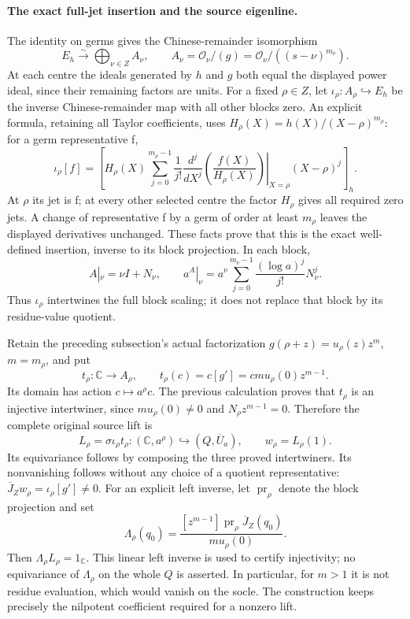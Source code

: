 \documentclass[10pt,a4paper,oneside]{report}
\begin{document}
\paragraph{The exact full-jet insertion and the source eigenline.}
The identity on germs gives the Chinese-remainder isomorphism
\[
 E_h\xrightarrow{\sim}\bigoplus_{\nu\in Z}A_\nu,
 \qquad A_\nu=\mathcal O_\nu/(g)
              =\mathcal O_\nu/((s-\nu)^{m_\nu}).
\]
At each centre the ideals generated by \(h\) and \(g\) both equal the
displayed power ideal, since their remaining factors are units.
For a fixed \(\rho\in Z\), let
\(\iota_\rho:A_\rho\hookrightarrow E_h\) be the inverse
Chinese-remainder map with all other blocks zero. An explicit formula,
retaining all Taylor coefficients, uses
\(H_\rho(X)=h(X)/(X-\rho)^{m_\rho}\): for a germ representative f,
\[
 \iota_\rho[f]=
 \left[H_\rho(X)\sum_{j=0}^{m_\rho-1}
 \frac{1}{j!}
 \left.\frac{d^j}{dX^j}\left(\frac{f(X)}{H_\rho(X)}\right)\right|_{X=\rho}
 (X-\rho)^j\right]_{h}.
\]
At \(\rho\) its jet is f; at every other selected centre the factor
\(H_\rho\) gives all required zero jets. A change of representative f
by a germ of order at least \(m_\rho\) leaves the displayed derivatives
unchanged. These facts prove that this is the exact well-defined
insertion, inverse to its block projection. In each block,
\[
 A|_\nu=\nu I+N_\nu,\qquad
 a^A|_\nu=a^\nu\sum_{j=0}^{m_\nu-1}
 \frac{(\log a)^j}{j!}N_\nu^j.
\]
Thus \(\iota_\rho\) intertwines the full block scaling; it does not
replace that block by its residue-value quotient.

Retain the preceding subsection's actual factorization
\(g(\rho+z)=u_\rho(z)z^m\), \(m=m_\rho\), and put
\[
 t_\rho:\mathbb C\longrightarrow A_\rho,
 \qquad t_\rho(c)=c[g']=cmu_\rho(0)z^{m-1}.
\]
Its domain has action \(c\mapsto a^\rho c\). The previous calculation
proves that \(t_\rho\) is an injective intertwiner, since
\(mu_\rho(0)\ne0\) and \(N_\rho z^{m-1}=0\). Therefore the complete
original source lift is
\[
 \boxed{L_\rho=\sigma\iota_\rho t_\rho:
 (\mathbb C,a^\rho)\hookrightarrow(Q,\overline U_a),
 \qquad w_\rho=L_\rho(1).}
\]
Its equivariance follows by composing the three proved
intertwiners. Its nonvanishing follows without any choice of a quotient
representative: \(\overline J_Zw_\rho=\iota_\rho[g']\ne0\).
For an explicit left inverse, let \(\operatorname{pr}_\rho\) denote the
block projection and set
\[
 \Lambda_\rho(q_0)=
 \frac{[z^{m-1}]\operatorname{pr}_\rho\overline J_Z(q_0)}
      {mu_\rho(0)}.
\]
Then \(\Lambda_\rho L_\rho=1_{\mathbb C}\). This linear left inverse
is used to certify injectivity; no equivariance of \(\Lambda_\rho\)
on the whole \(Q\) is asserted. In particular, for \(m>1\) it is not
residue evaluation, which would vanish on the socle. The construction
keeps precisely the nilpotent coefficient required for a nonzero lift.
\end{document}
